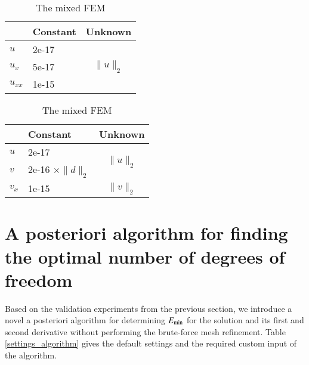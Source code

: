 \documentclass[review,3p]{elsarticle}
\begin{document}
\begin{table}[!ht]
\small
{}
\hspace{3.5cm}
\begin{subtable}{0.4\textwidth}
\caption{The standard FEM}
\begin{tabular}{l l c}
\hline
 & Constant & Unknown \\ \hline
$u$ & 2e-17 & \multirow{3}{*}{$\|u\|_2$} \\ \cline{1-2}
$u_x$ & 5e-17 & \\ \cline{1-2}
$u_{xx}$ & 1e-15 & \\ \hline
\end{tabular}
\end{subtable}
\hspace{-2cm}
\begin{subtable}{.4\textwidth}
\caption{The mixed FEM}
\begin{tabular}{l l c}
\hline
 & Constant & Unknown \\ \hline
$u$ & 2e-17 & \multirow{2}{*}{$\|u\|_2$} \\ \cline{1-2} 
$v$ & 2e-16 $\times \|d\|_2$ &  \\ \hline
$v_x$ & 1e-15 & $\|v\|_2$ \\ \hline
\end{tabular}
\end{subtable}
\label{relation_alpha_R_l2_norm_amended}
\end{table}


\newpage

\section{A posteriori algorithm for finding the optimal number of degrees of freedom}		\label{section_algorithm}

Based on the validation experiments from the previous section, we introduce a novel a posteriori algorithm for determining $E_{\rm min}$ for the solution and its first and second derivative without performing the brute-force mesh refinement. 
Table \ref{settings_algorithm} gives the default settings and the required custom input of the algorithm.
\end{document}

